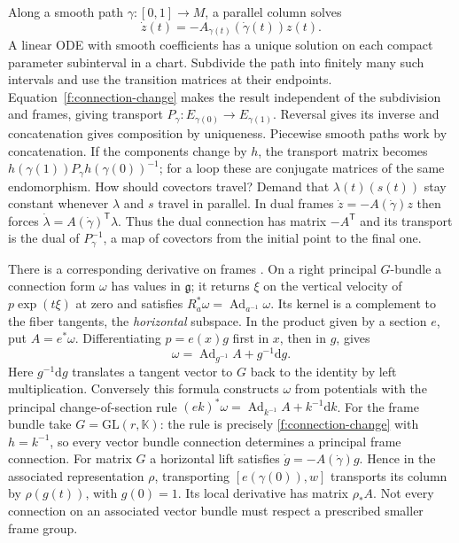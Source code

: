 Along a smooth path $\gamma:[0,1]\to M$, a parallel column solves
\begin{equation}
 \dot z(t)=-A_{\gamma(t)}(\dot\gamma(t))z(t).\label{f:parallel-ode}
\end{equation}
A linear ODE with smooth coefficients has a unique solution on each compact parameter subinterval in a chart. Subdivide the path into finitely many such intervals and use the transition matrices at their endpoints. Equation~\eqref{f:connection-change} makes the result independent of the subdivision and frames, giving transport $P_\gamma:E_{\gamma(0)}\to E_{\gamma(1)}$. Reversal gives its inverse and concatenation gives composition by uniqueness. Piecewise smooth paths work by concatenation. If the components change by $h$, the transport matrix becomes $h(\gamma(1))P_\gamma h(\gamma(0))^{-1}$; for a loop these are conjugate matrices of the same endomorphism. How should covectors travel? Demand that $\lambda(t)(s(t))$ stay constant whenever $\lambda$ and $s$ travel in parallel. In dual frames $\dot z=-A(\dot\gamma)z$ then forces $\dot\lambda=A(\dot\gamma)^{\mathsf T}\lambda$. Thus the dual connection has matrix $-A^{\mathsf T}$ and its transport is the dual of $P_\gamma^{-1}$, a map of covectors from the initial point to the final one.

There is a corresponding derivative on frames \cite{KN}. On a right principal $G$-bundle a connection form $\omega$ has values in $\mathfrak g$; it returns $\xi$ on the vertical velocity of $p\exp(t\xi)$ at zero and satisfies $R_a^*\omega=\operatorname{Ad}_{a^{-1}}\omega$. Its kernel is a complement to the fiber tangents, the \emph{horizontal} subspace. In the product given by a section $e$, put $A=e^*\omega$. Differentiating $p=e(x)g$ first in $x$, then in $g$, gives
\[
 \omega=\operatorname{Ad}_{g^{-1}}A+g^{-1}\mathrm dg .
\]
Here $g^{-1}\mathrm dg$ translates a tangent vector to $G$ back to the identity by left multiplication. Conversely this formula constructs $\omega$ from potentials with the principal change-of-section rule $(e k)^*\omega=\operatorname{Ad}_{k^{-1}}A+k^{-1}\mathrm dk$. For the frame bundle take $G=\mathrm{GL}(r,\mathbb K)$: the rule is precisely \eqref{f:connection-change} with $h=k^{-1}$, so every vector bundle connection determines a principal frame connection. For matrix $G$ a horizontal lift satisfies $\dot g=-A(\dot\gamma)g$. Hence in the associated representation $\rho$, transporting $[e(\gamma(0)),w]$ transports its column by $\rho(g(t))$, with $g(0)=1$. Its local derivative has matrix $\rho_* A$. Not every connection on an associated vector bundle must respect a prescribed smaller frame group.

